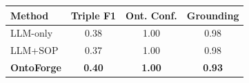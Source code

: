 \begin{tabular}{lccc}
\toprule
Method & Triple F1 & Ont. Conf. & Grounding \\
\midrule
LLM-only & 0.38 & 1.00 & 0.98 \\
LLM+SOP & 0.37 & 1.00 & 0.98 \\
\midrule
\textbf{OntoForge} & \textbf{0.40} & \textbf{1.00} & \textbf{0.93} \\
\bottomrule
\end{tabular}
